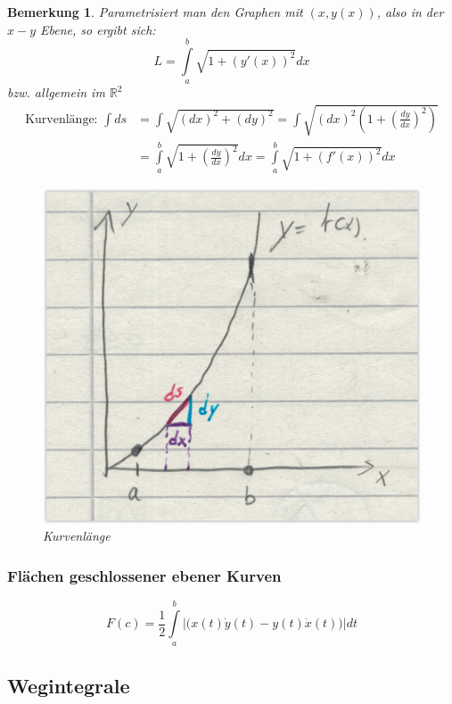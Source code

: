 \documentclass[12pt,a4paper]{article}%
\newtheorem{bem}{Bemerkung}[section]
\numberwithin{equation}{section}
\newcommand{\R}{\mathbb{R}} %
\numberwithin{equation}{subsection}
\begin{document}
	  \begin{bem}
	    Parametrisiert man den Graphen mit $(x, y(x))$, also in der $x-y$ Ebene, so ergibt sich:
	    \begin{equation}
	      L = \int\limits_a^b \sqrt{1 + (y'(x))^2}dx
	    \end{equation}
	    bzw. allgemein im $\R^2$
	    \begin{align*}
	      \text{Kurvenlänge: } \int ds &= \int \sqrt{(dx)^2 + (dy)^2} = \int \sqrt{(dx)^2 \left( 1 + \left(\frac{dy}{dx}\right)^2\right)} \\
	      &= \int\limits_a^b \sqrt{1 + \left(\frac{dy}{dx}\right)^2 }dx = \int\limits_a^b \sqrt{1 + (f'(x))^2}dx
	    \end{align*}
	    \begin{figure}[H] 
				\centering
			  \includegraphics[width=0.4\linewidth]{kurvenlaenge.png}
			  \caption{Kurvenlänge}
			  \label{fig:lkurvenlaenge}
      \end{figure}
	  \end{bem}
	  
	  \subsubsection{Flächen geschlossener ebener Kurven}
	  \begin{equation}
	    F(c) = \frac{1}{2} \int\limits_a^b \big|\big(x(t)\dot{y}(t) - y(t)\dot{x}(t)\big)\big|dt
	  \end{equation}
  \subsection{Wegintegrale}
\end{document}
